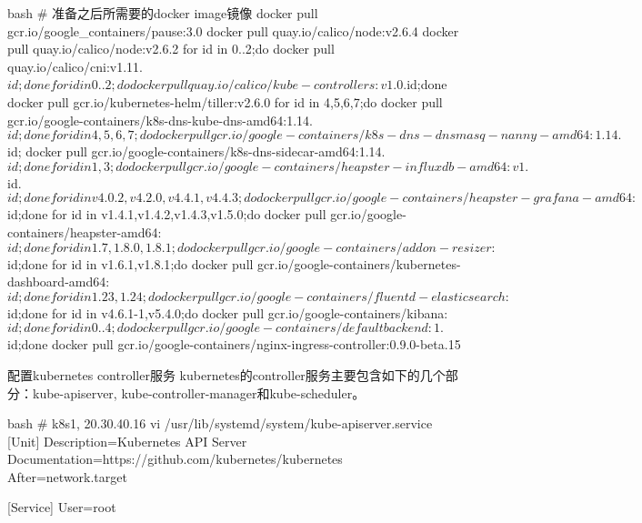 \begin{outline}[enumerate]
\begin{code-in-enumerate}{bash}
# 准备之后所需要的docker image镜像
docker pull gcr.io/google_containers/pause:3.0
docker pull quay.io/calico/node:v2.6.4
docker pull quay.io/calico/node:v2.6.2
for id in {0..2};do docker pull quay.io/calico/cni:v1.11.$id;done
for id in {0..2};do docker pull quay.io/calico/kube-controllers:v1.0.$id;done
docker pull gcr.io/kubernetes-helm/tiller:v2.6.0
for id in {4,5,6,7};do docker pull gcr.io/google-containers/k8s-dns-kube-dns-amd64:1.14.$id;done
for id in {4,5,6,7};do docker pull gcr.io/google-containers/k8s-dns-dnsmasq-nanny-amd64:1.14.$id; docker pull gcr.io/google-containers/k8s-dns-sidecar-amd64:1.14.$id;done
for id in {1,3};do docker pull gcr.io/google-containers/heapster-influxdb-amd64:v1.$id.$id;done
for id in {v4.0.2,v4.2.0,v4.4.1,v4.4.3};do docker pull gcr.io/google-containers/heapster-grafana-amd64:$id;done
for id in {v1.4.1,v1.4.2,v1.4.3,v1.5.0};do docker pull gcr.io/google-containers/heapster-amd64:$id;done
for id in {1.7,1.8.0,1.8.1};do docker pull gcr.io/google-containers/addon-resizer:$id;done
for id in {v1.6.1,v1.8.1};do docker pull gcr.io/google-containers/kubernetes-dashboard-amd64:$id;done
for id in {1.23,1.24};do docker pull gcr.io/google-containers/fluentd-elasticsearch:$id;done
for id in {v4.6.1-1,v5.4.0};do docker pull gcr.io/google-containers/kibana:$id;done
for id in {0..4};do docker pull gcr.io/google-containers/defaultbackend:1.$id;done
docker pull gcr.io/google-containers/nginx-ingress-controller:0.9.0-beta.15
\end{code-in-enumerate}

  \1 配置kubernetes controller服务
kubernetes的controller服务主要包含如下的几个部分：kube-apiserver, kube-controller-manager和kube-scheduler。
\begin{code-in-enumerate}{bash}
# k8s1, 20.30.40.16
vi /usr/lib/systemd/system/kube-apiserver.service
[Unit]
Description=Kubernetes API Server
Documentation=https://github.com/kubernetes/kubernetes
After=network.target

[Service]
User=root


\end{code-in-enumerate}
\end{outline}
